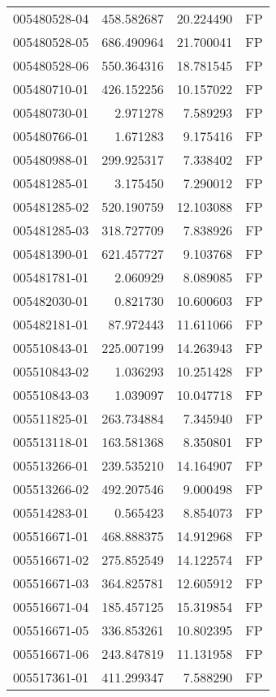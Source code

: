 \begin{tabular}{lrrl}
005480528-04 &  458.582687 &    20.224490 &   FP \\
005480528-05 &  686.490964 &    21.700041 &   FP \\
005480528-06 &  550.364316 &    18.781545 &   FP \\
005480710-01 &  426.152256 &    10.157022 &   FP \\
005480730-01 &    2.971278 &     7.589293 &   FP \\
005480766-01 &    1.671283 &     9.175416 &   FP \\
005480988-01 &  299.925317 &     7.338402 &   FP \\
005481285-01 &    3.175450 &     7.290012 &   FP \\
005481285-02 &  520.190759 &    12.103088 &   FP \\
005481285-03 &  318.727709 &     7.838926 &   FP \\
005481390-01 &  621.457727 &     9.103768 &   FP \\
005481781-01 &    2.060929 &     8.089085 &   FP \\
005482030-01 &    0.821730 &    10.600603 &   FP \\
005482181-01 &   87.972443 &    11.611066 &   FP \\
005510843-01 &  225.007199 &    14.263943 &   FP \\
005510843-02 &    1.036293 &    10.251428 &   FP \\
005510843-03 &    1.039097 &    10.047718 &   FP \\
005511825-01 &  263.734884 &     7.345940 &   FP \\
005513118-01 &  163.581368 &     8.350801 &   FP \\
005513266-01 &  239.535210 &    14.164907 &   FP \\
005513266-02 &  492.207546 &     9.000498 &   FP \\
005514283-01 &    0.565423 &     8.854073 &   FP \\
005516671-01 &  468.888375 &    14.912968 &   FP \\
005516671-02 &  275.852549 &    14.122574 &   FP \\
005516671-03 &  364.825781 &    12.605912 &   FP \\
005516671-04 &  185.457125 &    15.319854 &   FP \\
005516671-05 &  336.853261 &    10.802395 &   FP \\
005516671-06 &  243.847819 &    11.131958 &   FP \\
005517361-01 &  411.299347 &     7.588290 &   FP \\

\end{tabular}
